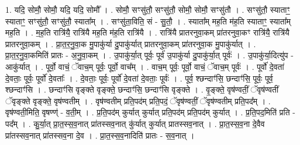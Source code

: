 \documentclass[17pt]{extarticle}
\begin{document}
1. यदि॒ सोमौ॒ सोमौ॒ यदि॒ यदि॒ सोमौ᳚ । . सोमौ॒ सꣳसु॑तौ॒ सꣳसु॑तौ॒ सोमौ॒ सोमौ॒ सꣳसु॑तौ । . सꣳसु॑तौ॒ स्याताꣳ॒॒ स्याताꣳ॒॒ सꣳसु॑तौ॒ सꣳसु॑तौ॒ स्याता᳚म् । . सꣳसु॑ता॒विति॒ सं - सु॒तौ॒ । . स्याता᳚म् मह॒ति म॑ह॒ति स्याताꣳ॒॒ स्याता᳚म् मह॒ति । . म॒ह॒ति रात्रि॑यै॒ रात्रि॑यै मह॒ति म॑ह॒ति रात्रि॑यै । . रात्रि॑यै प्रातरनुवा॒कम् प्रा॑तरनुवा॒कꣳ रात्रि॑यै॒ रात्रि॑यै प्रातरनुवा॒कम् । . प्रा॒त॒र॒नु॒वा॒क मु॒पाकु॑र्या दु॒पाकु॑र्यात् प्रातरनुवा॒कम् प्रा॑तरनुवा॒क मु॒पाकु॑र्यात् । . प्रा॒त॒र॒नु॒वा॒कमिति॑ प्रातः - अ॒नु॒वा॒कम् । . उ॒पाकु॑र्या॒त् पूर्वः॒ पूर्व॑ उ॒पाकु॑र्या दु॒पाकु॑र्या॒त् पूर्वः॑ । . उ॒पाकु॑र्या॒दित्यु॑प - आकु॑र्यात् । . पूर्वो॒ वाचं॒ ॅवाच॒म् पूर्वः॒ पूर्वो॒ वाच᳚म् । . वाच॒म् पूर्वः॒ पूर्वो॒ वाचं॒ ॅवाच॒म् पूर्वः॑ । . पूर्वो॑ दे॒वता॑ दे॒वताः॒ पूर्वः॒ पूर्वो॑ दे॒वताः᳚ । . दे॒वताः॒ पूर्वः॒ पूर्वो॑ दे॒वता॑ दे॒वताः॒ पूर्वः॑ । . पूर्व॒ श्छन्दाꣳ॑सि॒ छन्दाꣳ॑सि॒ पूर्वः॒ पूर्व॒ श्छन्दाꣳ॑सि । . छन्दाꣳ॑सि वृङ्क्ते वृङ्क्ते॒ छन्दाꣳ॑सि॒ छन्दाꣳ॑सि वृङ्क्ते । . वृ॒ङ्क्ते॒ वृष॑ण्वतीं॒ ॅवृष॑ण्वतीं ॅवृङ्क्ते वृङ्क्ते॒ वृष॑ण्वतीम् । . वृष॑ण्वतीम् प्रति॒पद॑म् प्रति॒पदं॒ ॅवृष॑ण्वतीं॒ ॅवृष॑ण्वतीम् प्रति॒पद᳚म् । . वृष॑ण्वती॒मिति॒ वृषण्ण्॑ - व॒ती॒म् । . प्र॒ति॒पद॑म् कुर्यात् कुर्यात् प्रति॒पद॑म् प्रति॒पद॑म् कुर्यात् । . प्र॒ति॒पद॒मिति॑ प्रति - पद᳚म् । . कु॒र्या॒त् प्रा॒त॒स्स॒व॒नात् प्रा॑तस्सव॒नात् कु॑र्यात् कुर्यात् प्रातस्सव॒नात् । . प्रा॒त॒स्स॒व॒ना दे॒वैव प्रा॑तस्सव॒नात् प्रा॑तस्सव॒ना दे॒व । . प्रा॒त॒स्स॒व॒नादिति॑ प्रातः - स॒व॒नात् । \newline
\end{document}
